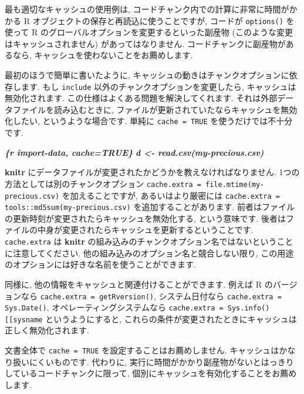 \documentclass[
  11pt,
  lualatex,ja=standard,jafont=noto]{bxjsreport}
\newenvironment{Shaded}{\begin{snugshade}}{\end{snugshade}}
\newcommand{\InformationTok}[1]{\textcolor[rgb]{0.56,0.35,0.01}{\textbf{\textit{#1}}}}
\begin{document}
最も適切なキャッシュの使用例は, コードチャンク内での計算に非常に時間がかかる R オブジェクトの保存と再読込に使うことですが, コードが \texttt{options()} を使って R のグローバルオプションを変更するといった副産物 (このような変更はキャッシュされません) があってはなりません. コードチャンクに副産物があるなら, キャッシュを使わないことをお薦めします.

最初のほうで簡単に書いたように, キャッシュの動きはチャンクオプションに依存します. もし \texttt{include} 以外のチャンクオプションを変更したら, キャッシュは無効化されます. この仕様はよくある問題を解決してくれます. それは外部データファイルを読み込むときに, ファイルが更新されていたならキャッシュを無効化したい, というような場合です. 単純に \texttt{cache = TRUE} を使うだけでは不十分です.

\begin{Shaded}
\begin{Highlighting}[]
\InformationTok{\textasciigrave{}\textasciigrave{}\textasciigrave{}\{r import{-}data, cache=TRUE\}}
\InformationTok{d \textless{}{-} read.csv(\textquotesingle{}my{-}precious.csv\textquotesingle{})}
\InformationTok{\textasciigrave{}\textasciigrave{}\textasciigrave{}}
\end{Highlighting}
\end{Shaded}

\textbf{knitr} にデータファイルが変更されたかどうかを教えなければなりません. 1つの方法としては別のチャンクオプション \texttt{cache.extra = file.mtime(\textquotesingle{}my-precious.csv\textquotesingle{})} を加えることですが, あるいはより厳密には \texttt{cache.extra = tools::md5sum(\textquotesingle{}my-precious.csv\textquotesingle{})} を追加することがあります. 前者はファイルの更新時刻が変更されたらキャッシュを無効化する, という意味です. 後者はファイルの中身が変更されたらキャッシュを更新するということです. \texttt{cache.extra} は \textbf{knitr} の組み込みのチャンクオプション名ではないということに注意してください. 他の組み込みのオプション名と競合しない限り, この用途のオプションには好きな名前を使うことができます.

同様に, 他の情報をキャッシュと関連付けることができます. 例えば R のバージョンなら \texttt{cache.extra = getRversion()}, システム日付なら \texttt{cache.extra = Sys.Date()}, オペレーティングシステムなら \texttt{cache.extra = Sys.info(){[}{[}\textquotesingle{}sysname\textquotesingle{}{]}{]}} というようにすると, これらの条件が変更されたときにキャッシュは正しく無効化されます.

文書全体で \texttt{cache = TRUE} を設定することはお薦めしません. キャッシュはかなり扱いにくいものです. 代わりに, 実行に時間がかかり副産物がないとはっきりしているコードチャンクに限って, 個別にキャッシュを有効化することをお薦めします.
\end{document}
